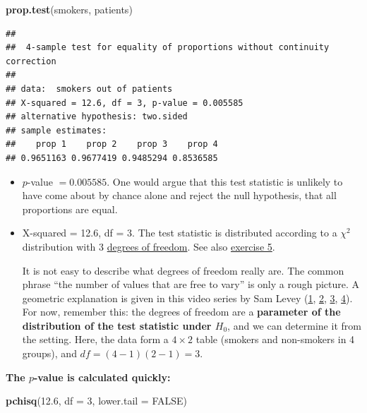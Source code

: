 \documentclass[
]{book}
\newenvironment{Shaded}{\begin{snugshade}}{\end{snugshade}}
\newcommand{\AttributeTok}[1]{\textcolor[rgb]{0.13,0.29,0.53}{#1}}
\newcommand{\ConstantTok}[1]{\textcolor[rgb]{0.56,0.35,0.01}{#1}}
\newcommand{\DecValTok}[1]{\textcolor[rgb]{0.00,0.00,0.81}{#1}}
\newcommand{\FloatTok}[1]{\textcolor[rgb]{0.00,0.00,0.81}{#1}}
\newcommand{\FunctionTok}[1]{\textcolor[rgb]{0.13,0.29,0.53}{\textbf{#1}}}
\newcommand{\NormalTok}[1]{#1}
\begin{document}
\begin{Shaded}
\begin{Highlighting}[]
\FunctionTok{prop.test}\NormalTok{(smokers, patients)}
\end{Highlighting}
\end{Shaded}

\begin{verbatim}
## 
##  4-sample test for equality of proportions without continuity correction
## 
## data:  smokers out of patients
## X-squared = 12.6, df = 3, p-value = 0.005585
## alternative hypothesis: two.sided
## sample estimates:
##    prop 1    prop 2    prop 3    prop 4 
## 0.9651163 0.9677419 0.9485294 0.8536585
\end{verbatim}

\begin{itemize}
\item
  \(p\)-value \(= 0.005585\). One would argue that this test statistic is unlikely to have come about by chance
  alone and reject the null hypothesis, that all proportions are equal.
\item
  X-squared = 12.6, df = 3. The test statistic is distributed according to a \(\chi^2\) distribution
  with 3 \href{https://en.wikipedia.org/wiki/Degrees_of_freedom_(statistics)}{degrees of freedom}.
  See also \hyperref[exercise5_nhst]{exercise 5}.

  It is not easy to describe what degrees of freedom really are. The common phrase ``the number of values that are free to vary''
  is only a rough picture. A geometric explanation is given in this video series by Sam Levey
  (\href{https://www.youtube.com/watch?v=VDlnuO96p58}{1}, \href{https://www.youtube.com/watch?v=8e9aDMXRRlc}{2},
  \href{https://www.youtube.com/watch?v=ExQJQPF_Fpk}{3}, \href{https://www.youtube.com/watch?v=hsZw9hJspTY}{4}).
  For now, remember this: the degrees of freedom are a \textbf{parameter of the distribution of the test statistic under \(H_0\)},
  and we can determine it from the setting. Here, the data form a \(4 \times 2\) table (smokers and non-smokers in 4 groups),
  and \(df = (4-1)(2-1) = 3\).
\end{itemize}

\textbf{The \(p\)-value is calculated quickly:}

\begin{Shaded}
\begin{Highlighting}[]
\FunctionTok{pchisq}\NormalTok{(}\FloatTok{12.6}\NormalTok{, }\AttributeTok{df =} \DecValTok{3}\NormalTok{, }\AttributeTok{lower.tail =} \ConstantTok{FALSE}\NormalTok{)}
\end{Highlighting}
\end{Shaded}
\end{document}
